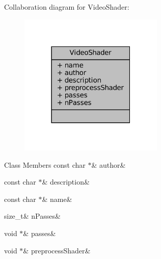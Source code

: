 Collaboration diagram for Video\+Shader\+:
\nopagebreak
\begin{figure}[H]
\begin{center}
\leavevmode
\includegraphics[width=195pt]{struct_video_shader__coll__graph}
\end{center}
\end{figure}
\begin{DoxyFields}{Class Members}
\mbox{\label{video-backend_8h_a5d1087670a38ad0104d78a2277aba9f0}} 
const char $\ast$&
author&
\\
\hline

\mbox{\label{video-backend_8h_aebc9fd55e95b736a6d3e52d65695f77d}} 
const char $\ast$&
description&
\\
\hline

\mbox{\label{video-backend_8h_a3817887a42088a5d83ac12f6ca79af3d}} 
const char $\ast$&
name&
\\
\hline

\mbox{\label{video-backend_8h_ad4ec0c86da57ea43278fd3aa20ad8e79}} 
size\_t&
nPasses&
\\
\hline

\mbox{\label{video-backend_8h_a01f636397b9732dd8a22368548dfcf86}} 
void $\ast$&
passes&
\\
\hline

\mbox{\label{video-backend_8h_a51d27eef979b560f119b38995e522707}} 
void $\ast$&
preprocessShader&
\\
\hline

\end{DoxyFields}


